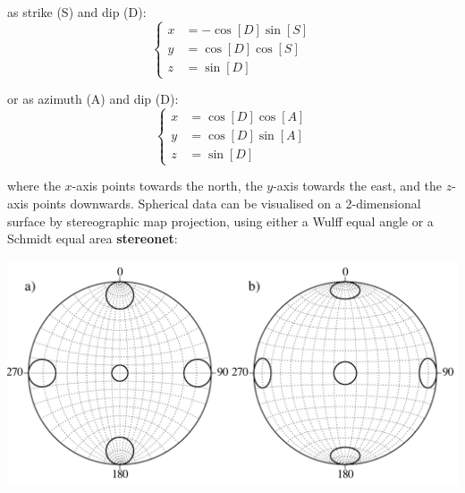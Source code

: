 \noindent as strike (S) and dip (D):
\begin{equation}
  \left\{
  \begin{split}
    x & = -\cos[D]\sin[S]\\
    y & = \cos[D]\cos[S]\\
    z & = \sin[D]
  \end{split}
  \right.
  \label{eq:SD}
\end{equation}

\noindent or as azimuth (A) and dip (D):
\begin{equation}
  \left\{
  \begin{split}
    x & = \cos[D] \cos[A]\\
    y & = \cos[D] \sin[A]\\
    z & = \sin[D]
  \end{split}
  \right.
  \label{eq:AD}
\end{equation}

\noindent where the $x$-axis points towards the north, the $y$-axis
towards the east, and the $z$-axis points downwards.  Spherical data
can be visualised on a 2-dimensional surface by stereographic map
projection, using either a Wulff equal angle or a Schmidt equal area
\textbf{stereonet}:

\noindent\begin{minipage}[t][][b]{.6\textwidth}
\includegraphics[]{../figures/wulffschmidt.pdf}\medskip
\end{minipage}
\begin{minipage}[t][][t]{.4\textwidth}
  \label{fig:wulffschmidt}
\end{minipage}

